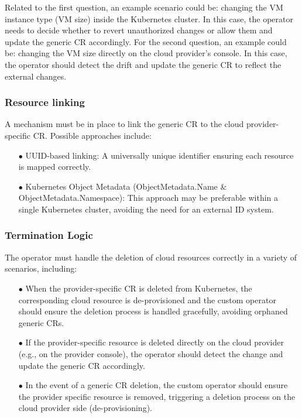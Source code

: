 Related to the first question, an example scenario could be: changing the VM instance type (VM size) inside the Kubernetes cluster. 
In this case, the operator needs to decide whether to revert unauthorized changes or allow them and update the generic CR accordingly.
For the second question, an example could be: changing the VM size directly on the cloud provider’s console. 
In this case, the operator should detect the drift and update the generic CR to reflect the external changes.

\subsubsection{Resource linking}

A mechanism must be in place to link the generic CR to the cloud provider-specific CR. 
Possible approaches include:
\begin{itemize}[itemsep=0.2pt, topsep=1pt]
  \item[$\bullet$] UUID-based linking: A universally unique identifier ensuring each resource is mapped correctly.
  \item[$\bullet$] Kubernetes Object Metadata (ObjectMetadata.Name \& ObjectMetadata.Namespace): This approach may be preferable within a single Kubernetes cluster, avoiding the need for an external ID system.
\end{itemize}

\subsubsection{Termination Logic}

The operator must handle the deletion of cloud resources correctly in a variety of scenarios, including:
\begin{itemize}[itemsep=0.2pt, topsep=1pt]
  \item[$\bullet$] When the provider-specific CR is deleted from Kubernetes, the corresponding cloud resource is de-provisioned and the custom operator should ensure the deletion process is handled gracefully, avoiding orphaned generic CRs.
  \item[$\bullet$] If the provider-specific resource is deleted directly on the cloud provider (e.g., on the provider console), the operator should detect the change and update the generic CR accordingly.
  \item[$\bullet$] In the event of a generic CR deletion, the custom operator should ensure the provider specific resource is removed, triggering a deletion process on the cloud provider side (de-provisioning).
\end{itemize}

